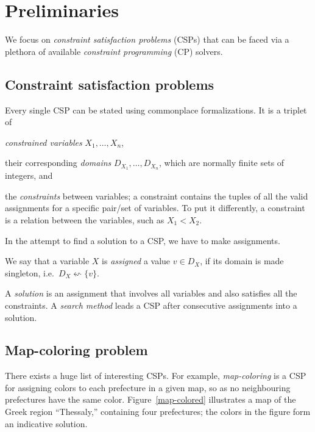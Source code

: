 \documentclass{ws-ijait}
\begin{document}
\section{Preliminaries\label{preliminaries}}

We focus on \emph{constraint satisfaction problems}
(CSPs)\cite{Tsang2014} that can be faced via a plethora of
available \emph{constraint programming} (CP)
solvers.\cite{ECLiPSe2017,Ilog2012}

\subsection{Constraint satisfaction problems}

Every single CSP can be stated using commonplace
formalizations.\cite{Russell2010} It is a triplet of
\begin{romanlist}
  \item \emph{constrained variables} $X_1, \ldots, X_n$,
  \item their corresponding \emph{domains} $D_{X_1}, \ldots,
        D_{X_n}$, which are normally finite sets of
        integers, and
  \item the \emph{constraints} between variables; a
        constraint contains the tuples of all the valid
        assignments for a specific pair\slash set of
        variables. To put it differently, a constraint is a
        relation between the variables, such as $X_1 < X_2$.
\end{romanlist}
In the attempt to find a solution to a CSP, we have to make
assignments.
\begin{definition}
  We say that a variable $X$ is \emph{assigned} a value $v
  \in D_X$, if its domain is made singleton, i.e.\ $D_X
  \leftsquigarrow \{v\}$.
\end{definition}
A \emph{solution} is an assignment that involves all
variables and also satisfies all the constraints. A
\emph{search method} leads a CSP after consecutive
assignments into a solution.

\subsection{Map-coloring problem}

There exists a huge list of interesting CSPs.\cite{Gent1999}
For example, \emph{map-coloring} is a CSP for assigning
colors to each prefecture in a given map, so as no
neighbouring prefectures have the same color.
Figure~\ref{map-colored} illustrates a map of the Greek
region ``Thessaly,'' containing four prefectures; the colors
in the figure form an indicative solution.
\end{document}
